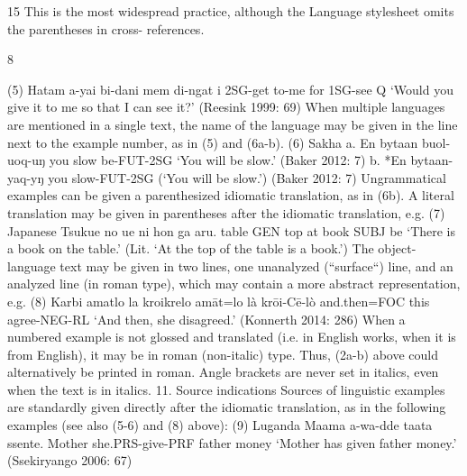  	
 	
 	
 	
 	
 	
 	
 	
 	
 	
 	
 	
 	
 	
 	
 	
 	
 	
 	
 	
 	
 	
 	
 	
 	
 	
 	
 	
 	
 	
 	
 	
 	
 	
 	
 	
 	
 	
	
 
15
This is the most widespread practice, although the Language stylesheet omits the parentheses in cross-
references.
	
 
 8	
  
(5) Hatam
a-yai
 bi-dani mem di-ngat i
2SG-get to-me for
 1SG-see Q
‘Would you give it to me so that I can see it?’ (Reesink 1999: 69)
When multiple languages are mentioned in a single text, the name of the language may be
given in the line next to the example number, as in (5) and (6a-b).
(6) Sakha
a. En bytaan buol-uoq-uŋ
you slow
 be-FUT-2SG
‘You will be slow.’ (Baker 2012: 7)
b. *En bytaan-yaq-yŋ
you slow-FUT-2SG
(‘You will be slow.’) (Baker 2012: 7)
Ungrammatical examples can be given a parenthesized idiomatic translation, as in (6b). A
literal translation may be given in parentheses after the idiomatic translation, e.g.
(7) Japanese
Tsukue no ue ni hon
 ga aru.
table
 GEN top at book SUBJ be
‘There is a book on the table.’ (Lit. ‘At the top of the table is a book.’)
The object-language text may be given in two lines, one unanalyzed (“surface“) line, and an
analyzed line (in roman type), which may contain a more abstract representation, e.g.
(8) Karbi
amatlo la kroikrelo
amāt=lo
 là
 krōi-Cē-lò
and.then=FOC this agree-NEG-RL
‘And then, she disagreed.’ (Konnerth 2014: 286)
When a numbered example is not glossed and translated (i.e. in English works, when it
is from English), it may be in roman (non-italic) type. Thus, (2a-b) above could
alternatively be printed in roman.
Angle brackets are never set in italics, even when the text is in italics.
11. Source indications
Sources of linguistic examples are standardly given directly after the idiomatic translation,
as in the following examples (see also (5-6) and (8) above):
(9) Luganda
Maama a-wa-dde
 taata
 ssente.
Mother she.PRS-give-PRF father money
‘Mother has given father money.’ (Ssekiryango 2006: 67)
	
